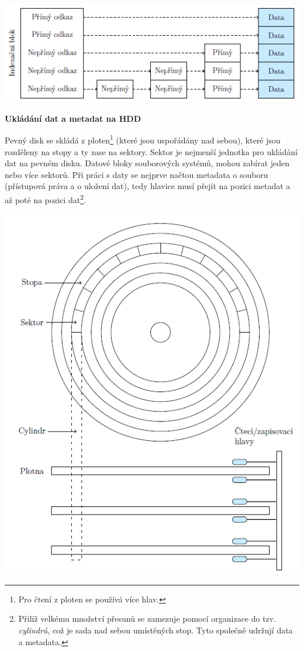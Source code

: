 \begin{center}
    \includegraphics[scale=1.2]{images/mem_block_index.png}
\end{center}

\begin{Large}
    \vspace{0,5cm}
    \textbf{Ukládání dat a metadat na HDD}
\end{Large}

Pevný disk se skládá z ploten\footnote{Pro čtení z ploten se používá více hlav.} (které jsou uspořádány nad sebou), které jsou rozděleny na stopy a ty zase na sektory. Sektor je nejmenší jednotka pro ukládání dat na pevném disku. Datové bloky souborových systémů, mohou zabírat jeden nebo více sektorů. Při práci s daty se nejprve načtou metadata o souboru (přístupová práva a o uložení dat), tedy hlavice musí přejít na pozici metadat a až poté na pozici dat\footnote{Přilíž velkému množství přesunů se zamezuje pomocí organizace do tzv. \textit{cylindrů}, což je sada nad sebou umístěných stop. Tyto společně udržují data a metadata.}.  

\begin{center}
    \includegraphics[scale=1]{images/mem_hdd.png}
\end{center}

